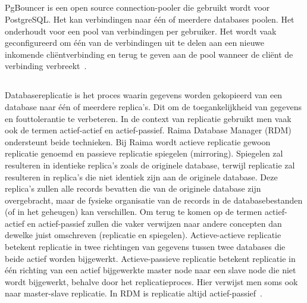 \subsection{}
\label{subsec:PgBouncer}

PgBouncer is een open source connection-pooler die gebruikt wordt voor PostgreSQL. Het kan verbindingen naar één of meerdere databases poolen. Het onderhoudt voor een pool van verbindingen per gebruiker. Het wordt vaak geconfigureerd om één van de verbindingen uit te delen aan een nieuwe inkomende cliëntverbinding en terug te geven aan de pool wanneer de cliënt de verbinding verbreekt~\autocite{Ramachandran2019}.

\subsection{}
\label{subsec:Raima}

Databasereplicatie is het proces waarin gegevens worden gekopieerd van een database naar één of meerdere replica's. Dit om de toegankelijkheid van gegevens en fouttolerantie te verbeteren.
In de context van replicatie gebruikt men vaak ook de termen actief-actief en actief-passief. Raima Database Manager (RDM) ondersteunt beide technieken. Bij Raima wordt actieve replicatie gewoon replicatie genoemd en passieve replicatie spiegelen (mirroring). Spiegelen zal resulteren in identieke replica's zoals de originele database, terwijl replicatie zal resulteren in replica's die niet identiek zijn aan de originele database. Deze replica's zullen alle records bevatten die van de originele database zijn overgebracht, maar de fysieke organisatie van de records in de databasebestanden (of in het geheugen) kan verschillen.
Om terug te komen op de termen actief-actief en actief-passief zullen die vaker verwijzen naar andere concepten dan dewelke juist omschreven (replicatie en spiegelen). Actieve-actieve replicatie betekent replicatie in twee richtingen van gegevens tussen twee databases die beide actief worden bijgewerkt. Actieve-passieve replicatie betekent replicatie in één richting van een actief bijgewerkte master node naar een slave node die niet wordt bijgewerkt, behalve door het replicatieproces. Hier verwijst men soms ook naar master-slave replicatie. In RDM is replicatie altijd actief-passief~\autocite{Raima2021}. %

\subsection{}
\label{subsec:EDB}

